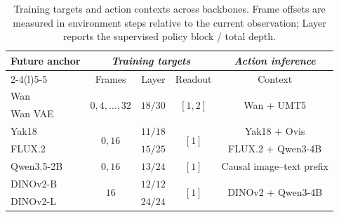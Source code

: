 \begin{table}[htbp]
\vspace{-2mm}
\caption{Training targets and action contexts across backbones. Frame offsets are measured in environment steps relative to the current observation; Layer reports the supervised policy block / total depth.}
\vspace{2mm}
\label{tab:targetinterfaces}
\centering
\small
\setlength{\tabcolsep}{4pt}
\renewcommand{\arraystretch}{1.2}
\begin{tabular*}{\textwidth}{@{\extracolsep{\fill}}lcccc@{}}
\toprule
\multirow{2}{*}{Future anchor} & \multicolumn{3}{c}{\textit{Training targets}} & \multicolumn{1}{c}{\textit{Action inference}} \\
\cmidrule(lr){2-4}\cmidrule(l){5-5}
 & Frames & Layer & Readout & Context \\
\midrule
Wan & \multirow{2}{*}{$0,4,\ldots,32$} & \multirow{2}{*}{$18/30$} & \multirow{2}{*}{$[1,2]$} & \multirow{2}{*}{Wan + UMT5} \\
Wan VAE & & & & \\
\midrule
Yak18 & \multirow{2}{*}{$0,16$} & $11/18$ & \multirow{2}{*}{$[1]$} & Yak18 + Ovis \\
FLUX.2 & & $15/25$ & & FLUX.2 + Qwen3-4B \\
\midrule
Qwen3.5-2B & $0,16$ & $13/24$ & $[1]$ & Causal image--text prefix \\
\midrule
DINOv2-B & \multirow{2}{*}{$16$} & $12/12$ & \multirow{2}{*}{$[1]$} & \multirow{2}{*}{DINOv2 + Qwen3-4B} \\
DINOv2-L & & $24/24$ & & \\
\bottomrule
\end{tabular*}
\vspace{-2mm}
\end{table}
